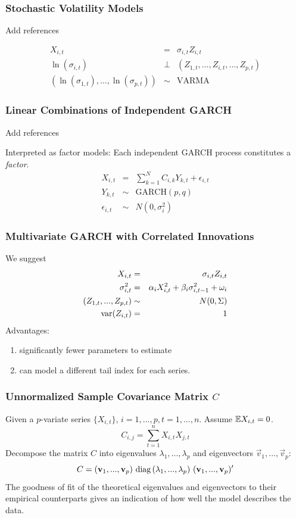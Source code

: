 \documentclass{beamer}
\begin{document}
\begin{frame}
  \frametitle{Stochastic Volatility Models}
  \textcolor[HTML]{FF0000}{Add references}
  
  \begin{eqnarray*}
    X_{i,t} &=& \sigma_{i, t} Z_{i, t} \\
    \ln(\sigma_{i,t}) &\bot& (Z_{1, t}, ..., Z_{i, t}, ..., Z_{p,t}) \\
    (\ln(\sigma_{1,t}), \dots, \ln(\sigma_{p,t})) &\sim& \text{VARMA}
  \end{eqnarray*}
\end{frame}

\begin{frame}
  \frametitle{Linear Combinations of Independent GARCH}
  \textcolor[HTML]{FF0000}{Add references}
  
  Interpreted as factor models: Each independent GARCH process
  constitutes a {\it factor}.
  \begin{eqnarray*}
    X_{i, t} &=& \sum_{k=1}^N C_{i,k} Y_{k, t} + \epsilon_{i, t} \\
    Y_{k, t} &\sim& \text{GARCH}(p,q) \\
    \epsilon_{i,t} &\sim& N(0, \sigma_i^2)
  \end{eqnarray*}
\end{frame}

\begin{frame}
  \frametitle{Multivariate GARCH with Correlated Innovations}
  We suggest
  \begin{eqnarray*}
    X_{i, t} &=& \sigma_{i, t} Z_{i, t} \\
    \sigma_{i, t}^2 &=& \alpha_{i} X_{i, t}^2 + \beta_{i} \sigma_{i, t-1}^2 + \omega_i \\
    (Z_{1, t}, ..., Z_{p, t}) &\sim& N(0, \Sigma) \\
    \text{var}(Z_{i,t}) &=& 1
  \end{eqnarray*}
  Advantages:
  \begin{enumerate}
  \item significantly fewer parameters to estimate
  \item can model a different tail index for each series.
  \end{enumerate}
\end{frame}

\begin{frame}
  \frametitle{Unnormalized Sample Covariance Matrix $C$}
  Given a $p$-variate series $\{X_{i, t}\}$, $i=1,...,p, t=1,...,n$.
  Assume $\mathbb{E} X_{i, t} = 0$.
  \[
  C_{i, j} = \sum_{t=1}^n X_{i,t} X_{j,t}
  \]
  Decompose the matrix $C$ into eigenvalues $\lambda_1, ...,
  \lambda_p$ and eigenvectors $\vec v_1, ..., \vec v_p$:
  \[
  C = (\vec v_1, ..., \vec v_p) \ 
  \diag(\lambda_1, ..., \lambda_p) \  
  (\vec v_1, ..., \vec v_p)'
  \]
  The goodness of fit of the theoretical eigenvalues and eigenvectors
  to their empirical counterparts gives an indication of how well the
  model describes the data.
\end{frame}
\end{document}
